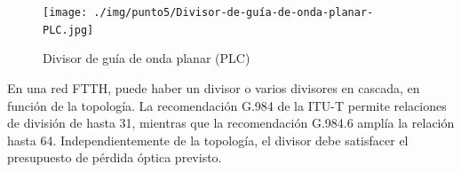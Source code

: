 \begin{center}
 
\begin{table}[H]  %

    \setlength\arrayrulewidth{1.5pt}
    \def\clinecolor{\hhline{|>{\arrayrulecolor{white}}-%
    >{\arrayrulecolor{white}}|-|-|}}
	\caption{\footnotesize{Pérdida de divisor}}
	\label{table:Splitter_losses}
\end{table}

\end{center}




\begin{figure}
  \begin{center}
   	\texttt{[image: ./img/punto5/Divisor-de-guía-de-onda-planar-PLC.jpg]}	
   	\caption{Divisor de guía de onda planar (PLC)}
	\label{fig:Planar_wave_guide}
  \end{center}  
\end{figure}


En una red FTTH, puede haber un divisor o varios divisores en cascada, en función de la topología. La recomendación G.984 de la ITU-T permite relaciones de división de hasta 31, mientras que la recomendación G.984.6 amplía la relación hasta 64. Independientemente de la topología, el divisor debe satisfacer el presupuesto de pérdida óptica previsto. \\

